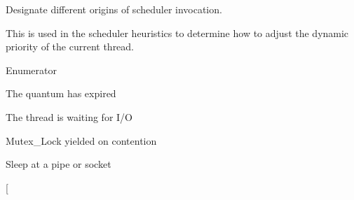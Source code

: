 Designate different origins of scheduler invocation. 

This is used in the scheduler heuristics to determine how to adjust the dynamic priority of the current thread. \begin{Desc}
\item[Enumerator]\par
\begin{description}
\item[{\em 
S\+C\+H\+E\+D\+\_\+\+Q\+U\+A\+N\+T\+UM\hypertarget{group__scheduler_ggaad787d8d80312ffca3c0f197b3a25fbea99764e3e8f3195b33e888c816c9a0207}{}\label{group__scheduler_ggaad787d8d80312ffca3c0f197b3a25fbea99764e3e8f3195b33e888c816c9a0207}
}]The quantum has expired \item[{\em 
S\+C\+H\+E\+D\+\_\+\+IO\hypertarget{group__scheduler_ggaad787d8d80312ffca3c0f197b3a25fbeaa19b25dfae8d75a5900bb23a1f6c64d8}{}\label{group__scheduler_ggaad787d8d80312ffca3c0f197b3a25fbeaa19b25dfae8d75a5900bb23a1f6c64d8}
}]The thread is waiting for I/O \item[{\em 
S\+C\+H\+E\+D\+\_\+\+M\+U\+T\+EX\hypertarget{group__scheduler_ggaad787d8d80312ffca3c0f197b3a25fbea7d3764881e09d1f0dbf2d8ef09640a37}{}\label{group__scheduler_ggaad787d8d80312ffca3c0f197b3a25fbea7d3764881e09d1f0dbf2d8ef09640a37}
}]Mutex\+\_\+\+Lock yielded on contention \item[{\em 
S\+C\+H\+E\+D\+\_\+\+P\+I\+PE\hypertarget{group__scheduler_ggaad787d8d80312ffca3c0f197b3a25fbea5f78cf7f43e406215d39f936fa99fd5a}{}\label{group__scheduler_ggaad787d8d80312ffca3c0f197b3a25fbea5f78cf7f43e406215d39f936fa99fd5a}
}]Sleep at a pipe or socket \item[{\em 
}
\end{description}
\end{Desc}

